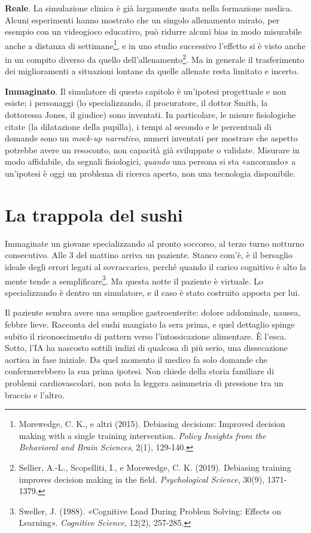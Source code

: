 \begin{concetto}
\textbf{Reale}. La simulazione clinica è già largamente usata nella formazione medica. Alcuni esperimenti hanno mostrato che un singolo allenamento mirato, per esempio con un videogioco educativo, può ridurre alcuni bias in modo misurabile anche a distanza di settimane\footnote{Morewedge, C. K., e altri (2015). Debiasing decisions: Improved decision making with a single training intervention. \textit{Policy Insights from the Behavioral and Brain Sciences}, 2(1), 129-140.}, e in uno studio successivo l'effetto si è visto anche in un compito diverso da quello dell'allenamento\footnote{Sellier, A.-L., Scopelliti, I., e Morewedge, C. K. (2019). Debiasing training improves decision making in the field. \textit{Psychological Science}, 30(9), 1371-1379.}. Ma in generale il trasferimento dei miglioramenti a situazioni lontane da quelle allenate resta limitato e incerto.

\textbf{Immaginato}. Il simulatore di questo capitolo è un'ipotesi progettuale e non esiste; i personaggi (lo specializzando, il procuratore, il dottor Smith, la dottoressa Jones, il giudice) sono inventati. In particolare, le misure fisiologiche citate (la dilatazione della pupilla), i tempi al secondo e le percentuali di domande sono un \textit{mock-up narrativo}, numeri inventati per mostrare che aspetto potrebbe avere un resoconto, non capacità già sviluppate o validate. Misurare in modo affidabile, da segnali fisiologici, \textit{quando} una persona si sta «ancorando» a un'ipotesi è oggi un problema di ricerca aperto, non una tecnologia disponibile.
\end{concetto}

\section{La trappola del sushi}
\label{sec:p4c33-la-trappola-del}
Immaginate un giovane specializzando al pronto soccorso, al terzo turno notturno consecutivo. Alle 3 del mattino arriva un paziente. Stanco com'è, è il bersaglio ideale degli errori legati al sovraccarico, perché quando il carico cognitivo è alto la mente tende a semplificare\footnote{Sweller, J. (1988). «Cognitive Load During Problem Solving: Effects on Learning». \textit{Cognitive Science}, 12(2), 257-285.}. Ma questa notte il paziente è virtuale. Lo specializzando è dentro un simulatore, e il caso è stato costruito apposta per lui.

Il paziente sembra avere una semplice gastroenterite: dolore addominale, nausea, febbre lieve. Racconta del sushi mangiato la sera prima, e quel dettaglio spinge subito il riconoscimento di pattern verso l'intossicazione alimentare. È l'esca. Sotto, l'IA ha nascosto sottili indizi di qualcosa di più serio, una dissecazione aortica in fase iniziale. Da quel momento il medico fa solo domande che confermerebbero la sua prima ipotesi. Non chiede della storia familiare di problemi cardiovascolari, non nota la leggera asimmetria di pressione tra un braccio e l'altro.

